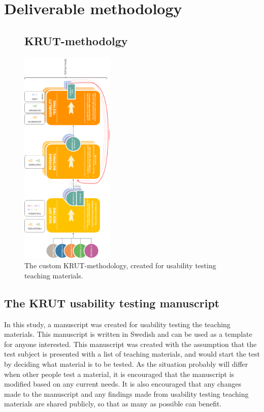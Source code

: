 \chapter{Deliverable methodology}


\mbox{}
\begin{figure}
\section{KRUT-methodolgy}
\includegraphics[trim={0 0cm 0 0},clip,width=0.4\textwidth,angle=-90]{figure/workflow.png}
\vspace*{2cm}
\caption{The custom KRUT-methodology, created for usability testing teaching materials.}
\label{app:krut}
\end{figure}

\newpage
\section{The KRUT usability testing manuscript}
In this study, a manuscript was created for usability testing the teaching materials. This manuscript is written in Swedish and can be used as a template for anyone interested. This manuscript was created with the assumption that the test subject is presented with a list of teaching materials, and would start the test by deciding what material is to be tested. As the situation probably will differ when other people test a material, it is encouraged that the manuscript is modified based on any current needs. It is also encouraged that any changes made to the manuscript and any findings made from usability testing teaching materials are shared publicly, so that as many as possible can benefit.

